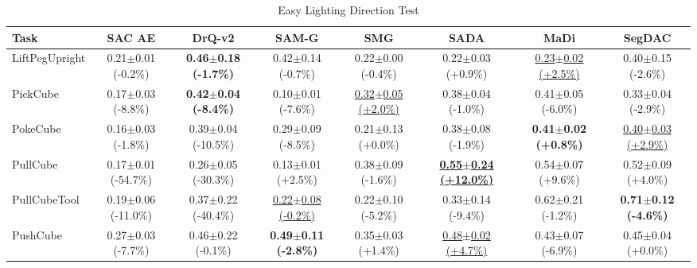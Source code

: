\begin{table}[htbp]
\centering
\scriptsize
\caption{Easy Lighting Direction Test}
\label{tab:appendix_lightingdirectiontest_easy}
\begin{adjustbox}{max width=\textwidth}
\begin{tabular}{l*{7}{c}}
\toprule
\textbf{Task} & \textbf{SAC AE} & \textbf{DrQ-v2} & \textbf{SAM-G} & \textbf{SMG} & \textbf{SADA} & \textbf{MaDi} & \textbf{SegDAC} \\
\midrule
LiftPegUpright & 0.21$\pm$0.01 \scriptsize{(-0.2\%)} & \textbf{0.46$\pm$0.18 \scriptsize{(-1.7\%)}} & 0.42$\pm$0.14 \scriptsize{(-0.7\%)} & 0.22$\pm$0.00 \scriptsize{(-0.4\%)} & 0.22$\pm$0.03 \scriptsize{(+0.9\%)} & \underline{0.23$\pm$0.02 \scriptsize{(+2.5\%)}} & 0.40$\pm$0.15 \scriptsize{(-2.6\%)} \\
PickCube & 0.17$\pm$0.03 \scriptsize{(-8.8\%)} & \textbf{0.42$\pm$0.04 \scriptsize{(-8.4\%)}} & 0.10$\pm$0.01 \scriptsize{(-7.6\%)} & \underline{0.32$\pm$0.05 \scriptsize{(+2.0\%)}} & 0.38$\pm$0.04 \scriptsize{(-1.0\%)} & 0.41$\pm$0.05 \scriptsize{(-6.0\%)} & 0.33$\pm$0.04 \scriptsize{(-2.9\%)} \\
PokeCube & 0.16$\pm$0.03 \scriptsize{(-1.8\%)} & 0.39$\pm$0.04 \scriptsize{(-10.5\%)} & 0.29$\pm$0.09 \scriptsize{(-8.5\%)} & 0.21$\pm$0.13 \scriptsize{(+0.0\%)} & 0.38$\pm$0.08 \scriptsize{(-1.9\%)} & \textbf{0.41$\pm$0.02 \scriptsize{(+0.8\%)}} & \underline{0.40$\pm$0.03 \scriptsize{(+2.9\%)}} \\
PullCube & 0.17$\pm$0.01 \scriptsize{(-54.7\%)} & 0.26$\pm$0.05 \scriptsize{(-30.3\%)} & 0.13$\pm$0.01 \scriptsize{(+2.5\%)} & 0.38$\pm$0.09 \scriptsize{(-1.6\%)} & \textbf{\underline{0.55$\pm$0.24 \scriptsize{(+12.0\%)}}} & 0.54$\pm$0.07 \scriptsize{(+9.6\%)} & 0.52$\pm$0.09 \scriptsize{(+4.0\%)} \\
PullCubeTool & 0.19$\pm$0.06 \scriptsize{(-11.0\%)} & 0.37$\pm$0.22 \scriptsize{(-40.4\%)} & \underline{0.22$\pm$0.08 \scriptsize{(-0.2\%)}} & 0.22$\pm$0.10 \scriptsize{(-5.2\%)} & 0.33$\pm$0.14 \scriptsize{(-9.4\%)} & 0.62$\pm$0.21 \scriptsize{(-1.2\%)} & \textbf{0.71$\pm$0.12 \scriptsize{(-4.6\%)}} \\
PushCube & 0.27$\pm$0.03 \scriptsize{(-7.7\%)} & 0.46$\pm$0.22 \scriptsize{(-0.1\%)} & \textbf{0.49$\pm$0.11 \scriptsize{(-2.8\%)}} & 0.35$\pm$0.03 \scriptsize{(+1.4\%)} & \underline{0.48$\pm$0.02 \scriptsize{(+4.7\%)}} & 0.43$\pm$0.07 \scriptsize{(-6.9\%)} & 0.45$\pm$0.04 \scriptsize{(+0.0\%)} \\

\end{tabular}
\end{adjustbox}
\end{table}
